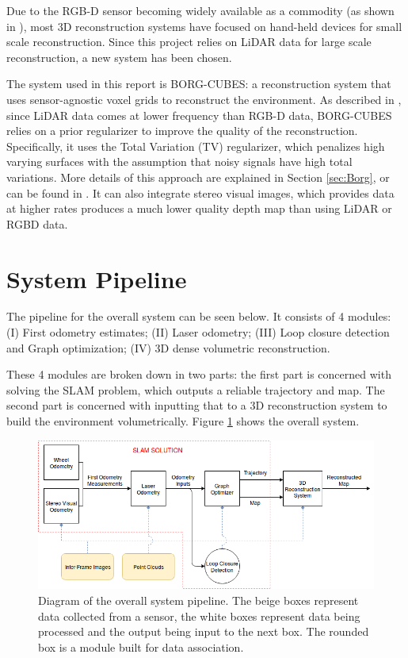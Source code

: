\documentclass[11pt]{article}
\begin{document}
Due to the RGB-D sensor becoming widely available as a commodity (as shown in \cite{kinectfusion}), most 3D reconstruction systems have focused on hand-held devices for small scale reconstruction. Since this project relies on LiDAR data for large scale reconstruction, a new system has been chosen.	
	
The system used in this report is BORG-CUBES: a reconstruction system that uses sensor-agnostic voxel grids to reconstruct the environment. As described in \cite{TannerFSR2015}, since LiDAR data comes at lower frequency than RGB-D data, BORG-CUBES relies on a prior regularizer to improve the quality of the reconstruction. Specifically, it uses the Total Variation (TV) regularizer, which penalizes high varying surfaces with the assumption that noisy signals have high total variations. More details of this approach are explained in Section \ref{sec:Borg}, or can be found in \cite{TannerFSR2015}. It can also integrate stereo visual images, which provides data at higher rates produces a much lower quality depth map than using LiDAR or RGBD data.	

	\newpage
	\section{System Pipeline} 
	\label{pipeline}

The pipeline for the overall system can be seen below. It consists of 4 modules: (I) First odometry estimates; (II) Laser odometry; (III) Loop closure detection and Graph optimization; (IV) 3D dense volumetric reconstruction.

These 4 modules are broken down in two parts: the first part is concerned with solving the SLAM problem, which outputs a reliable trajectory and map. The second part is concerned with inputting that to a 3D reconstruction system to build the environment volumetrically. Figure \ref{fig:SystemPipelineFigure1} shows the overall system.

\begin{figure}[h]
\includegraphics[width=\linewidth]{SystemPipeline}
\caption{Diagram of the overall system pipeline. The beige boxes represent data collected from a sensor, the white boxes represent data being processed and the output being input to the next box. The rounded box is a module built for data association.}
\label{fig:SystemPipelineFigure1}
\end{figure}
	
\end{document}
